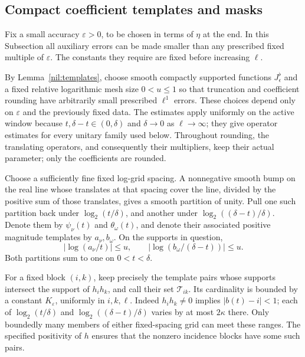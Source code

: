 \subsection{Compact coefficient templates and masks}

Fix a small accuracy \(\varepsilon>0\), to be chosen in terms of
\(\eta\) at the end.  In this Subsection all auxiliary errors can be
made smaller than any prescribed fixed multiple of \(\varepsilon\).
The constants they require are fixed before increasing \(\ell\).

By Lemma~\ref{nil:templates}, choose smooth compactly supported functions
\(J_\epsilon^\flat\) and a fixed relative logarithmic mesh size
\(0<u\le1\) so that truncation and coefficient rounding have arbitrarily
small prescribed \(\ell^1\) errors.  These choices depend only on
\(\varepsilon\) and the previously fixed data.
The estimates apply uniformly on the active window because
\(t,\delta-t\in(0,\delta)\) and \(\delta\to0\) as \(\ell\to\infty\);
they give operator estimates for every unitary family used below.
Throughout rounding, the translating operators, and consequently their
multipliers, keep their actual parameter; only the coefficients are rounded.

Choose a sufficiently fine fixed log-grid spacing.  A nonnegative
smooth bump on the real line whose translates at that spacing cover
the line, divided by the positive sum of those translates, gives a
smooth partition of unity.  Pull one such partition back under
\(\log_2(t/\delta)\), and another under
\(\log_2((\delta-t)/\delta)\).  Denote them by \(\psi_\nu(t)\)
and \(\theta_\omega(t)\), and denote their associated positive
magnitude templates by \(a_\nu,b_\omega\).  On the supports in
question,
\[
 |\log(a_\nu/t)|\le u,\qquad
 |\log(b_\omega/(\delta-t))|\le u.
\]
Both partitions sum to one on \(0<t<\delta\).

For a fixed block \((i,k)\), keep precisely the template pairs whose
supports intersect the support of \(h_i h_k\), and call their set
\(\mathcal T_{ik}\).  Its cardinality is bounded by a constant
\(K_\varepsilon\), uniformly in \(i,k,\ell\).  Indeed
\(h_i h_k\ne0\) implies \(|b(t)-i|<1\); each of
\(\log_2(t/\delta)\) and
\(\log_2((\delta-t)/\delta)\) varies by at most \(2\kappa\)
there.  Only boundedly many members of either fixed-spacing grid can
meet these ranges.  The specified positivity of \(h\) ensures that
the nonzero incidence blocks have some such pairs.

